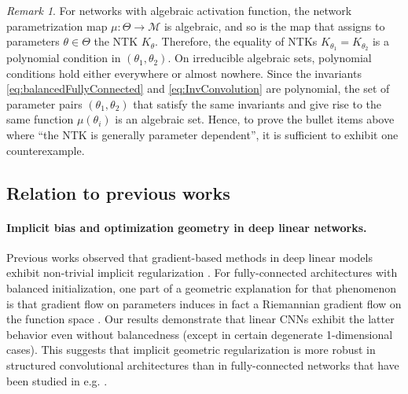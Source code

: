 \documentclass[twoside]{article}
\theoremstyle{definition}
\theoremstyle{remark}
\newtheorem{remark}[theorem]{Remark}
\begin{document}

\begin{remark}\label{rk:map algebraicity}
    For networks with algebraic activation function, the network parametrization map $\mu: \Theta \to \mathcal{M}$ is algebraic, and so is the map that assigns to parameters $\theta \in \Theta$ the NTK $K_\theta$. 
    Therefore, the equality of NTKs $K_{\theta_1}=K_{\theta_2}$ is a polynomial condition in $(\theta_1,\theta_2)$.
    On irreducible algebraic sets, polynomial conditions hold either everywhere or almost nowhere. 
    Since the invariants \eqref{eq:balancedFullyConnected} and \eqref{eq:InvConvolution} are polynomial, 
    the set of parameter pairs $(\theta_1,\theta_2)$ that satisfy the same invariants and give rise to the same function $\mu(\theta_i)$ is an algebraic set. 
    Hence, to prove the bullet items above where ``the NTK is generally parameter dependent'', it is sufficient to exhibit one counterexample. 
\end{remark}

\subsection{Relation to previous works}

\paragraph{Implicit bias and optimization geometry in deep linear networks.} 
Previous works observed that gradient-based methods in deep linear models exhibit non-trivial implicit regularization \cite{saxe2014exact,ji2019gradient,gunasekar2017implicit,gunasekar2018implicit}. For fully-connected architectures with balanced initialization, one part of a geometric explanation for that phenomenon is that gradient flow on parameters induces in fact a Riemannian gradient flow on the function space \cite{arora2019convergence,bah2022learning}. Our results demonstrate that linear CNNs exhibit the latter behavior even without balancedness (except in certain degenerate 1-dimensional cases). This suggests that implicit geometric regularization is more robust in structured convolutional architectures than in fully-connected networks that have been studied in e.g. \cite{moroshko2020implicit,woodworth2020kernel}.
\end{document}
